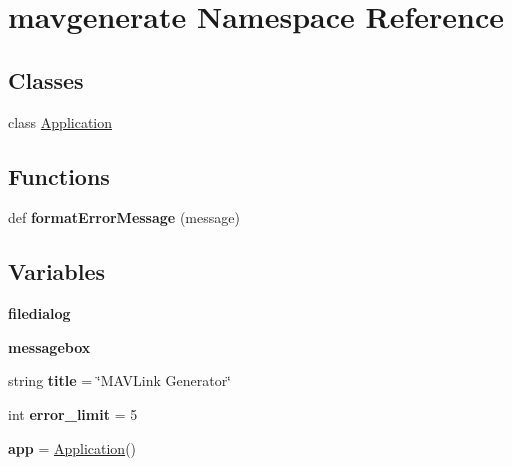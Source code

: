 \hypertarget{namespacemavgenerate}{}\section{mavgenerate Namespace Reference}
\label{namespacemavgenerate}
\subsection*{Classes}
\begin{DoxyCompactItemize}
\item 
class \hyperlink{classmavgenerate_1_1Application}{Application}
\end{DoxyCompactItemize}
\subsection*{Functions}
\begin{DoxyCompactItemize}
\item 
\mbox{\label{namespacemavgenerate_ab31bafcd01eeec04a79b671fc0d3b6cb}} 
def {\bfseries format\+Error\+Message} (message)
\end{DoxyCompactItemize}
\subsection*{Variables}
\begin{DoxyCompactItemize}
\item 
\mbox{\label{namespacemavgenerate_a7b6cad00167b3e4c72880cc2ec6ae0dc}} 
{\bfseries filedialog}
\item 
\mbox{\label{namespacemavgenerate_ac6129ad292c9e30313d3b4152e519558}} 
{\bfseries messagebox}
\item 
\mbox{\label{namespacemavgenerate_a0fc7c0cc014ba86fd1594a1c69a0a127}} 
string {\bfseries title} = \char`\"{}M\+A\+V\+Link Generator\char`\"{}
\item 
\mbox{\label{namespacemavgenerate_a1761dbc960fbb664cff6f950e36a172f}} 
int {\bfseries error\+\_\+limit} = 5
\item 
\mbox{\label{namespacemavgenerate_a64f779a0ad2294831760698754204a95}} 
{\bfseries app} = \hyperlink{classmavgenerate_1_1Application}{Application}()
\end{DoxyCompactItemize}


